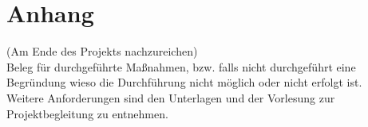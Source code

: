 \documentclass[accentcolor=tud0b,12pt,paper=a4]{tudreport}
\begin{document}
\appendix
  \chapter{Anhang}
    (Am Ende des Projekts nachzureichen)\\
    Beleg für durchgeführte Maßnahmen, bzw. falls nicht durchgeführt eine Begründung wieso die Durchführung nicht möglich oder nicht erfolgt ist. \\
    Weitere Anforderungen sind den Unterlagen und der Vorlesung zur Projektbegleitung zu entnehmen.
\end{document}
